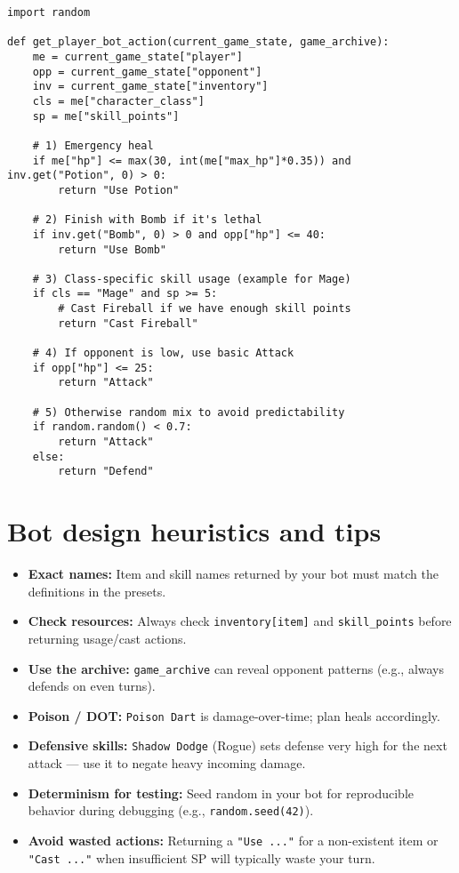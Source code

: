\documentclass[11pt]{article}
\begin{document}
\begin{lstlisting}
import random

def get_player_bot_action(current_game_state, game_archive):
    me = current_game_state["player"]
    opp = current_game_state["opponent"]
    inv = current_game_state["inventory"]
    cls = me["character_class"]
    sp = me["skill_points"]

    # 1) Emergency heal
    if me["hp"] <= max(30, int(me["max_hp"]*0.35)) and inv.get("Potion", 0) > 0:
        return "Use Potion"

    # 2) Finish with Bomb if it's lethal
    if inv.get("Bomb", 0) > 0 and opp["hp"] <= 40:
        return "Use Bomb"

    # 3) Class-specific skill usage (example for Mage)
    if cls == "Mage" and sp >= 5:
        # Cast Fireball if we have enough skill points
        return "Cast Fireball"

    # 4) If opponent is low, use basic Attack
    if opp["hp"] <= 25:
        return "Attack"

    # 5) Otherwise random mix to avoid predictability
    if random.random() < 0.7:
        return "Attack"
    else:
        return "Defend"
\end{lstlisting}

\section{Bot design heuristics and tips}
\begin{itemize}
  \item \textbf{Exact names:} Item and skill names returned by your bot must match the definitions in the presets.
  \item \textbf{Check resources:} Always check \texttt{inventory[item]} and \texttt{skill\_points} before returning usage/cast actions.
  \item \textbf{Use the archive:} \texttt{game\_archive} can reveal opponent patterns (e.g., always defends on even turns).
  \item \textbf{Poison / DOT:} \texttt{Poison Dart} is damage-over-time; plan heals accordingly.
  \item \textbf{Defensive skills:} \texttt{Shadow Dodge} (Rogue) sets defense very high for the next attack — use it to negate heavy incoming damage.
  \item \textbf{Determinism for testing:} Seed random in your bot for reproducible behavior during debugging (e.g., \texttt{random.seed(42)}).
  \item \textbf{Avoid wasted actions:} Returning a \texttt{"Use ..."} for a non-existent item or \texttt{"Cast ..."} when insufficient SP will typically waste your turn.
\end{itemize}
\end{document}
